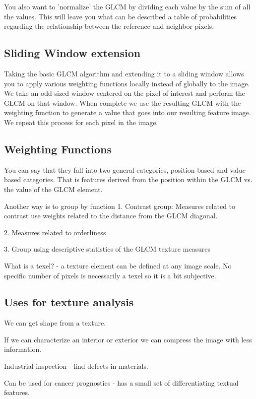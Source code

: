 \documentclass[a4paper,11pt]{article}
\begin{document}
You also want to 'normalize' the GLCM by dividing each value by the sum of all the values. This will leave you what can be described a table of probabilities regarding the relationship between the reference and neighbor pixels.

\subsection{Sliding Window extension}
Taking the basic GLCM algorithm and extending it to a sliding window allows you to apply various weighting functions locally instead of globally to the image. We take an odd-sized window centered on the pixel of interest and perform the GLCM on that window. When complete we use the resulting GLCM with the weighting function to generate a value that goes into our resulting feature image. We repeat this process for each pixel in the image.

\subsection{Weighting Functions}
You can say that they fall into two general categories, position-based and value-based categories. That is features derived from the position within the GLCM vs. the value of the GLCM element.

Another way is to group by function
1. Contrast group: Measures related to contrast use weights related to the distance from the GLCM diagonal.

2. Measures related to orderliness

3. Group using descriptive statistics of the GLCM texture measures



	What is a texel? - a texture element can be defined at any image scale. No specific number of pixels is necessarily a texel so it is a bit subjective.
			
	\subsection{Uses for texture analysis}
	We can get shape from a texture.
	
	If we can characterize an interior or exterior we can compress the image with less information.
	
	Industrial inspection - find defects in materials.
	
	Can be used for cancer prognostics - has a small set of differentiating textual features.
	
\end{document}
